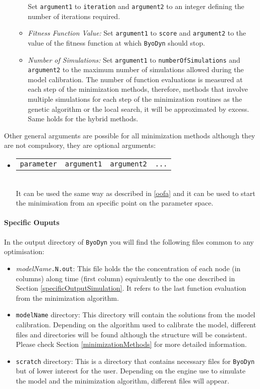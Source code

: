 \documentclass[a4paper, 11pt]{article}
\begin{document}
\begin{itemize}
\begin{itemize}
      Set \texttt{argument1} to \texttt{iteration} and \texttt{argument2} to an integer defining the number of iterations required.
    \item \textit{Fitness Function Value:}
      Set \texttt{argument1} to \texttt{score} and \texttt{argument2} to the value of the fitness function at which \texttt{ByoDyn} should stop.
    \item \textit{Number of Simulations:}
      Set \texttt{argument1} to \texttt{numberOfSimulations} and \texttt{argument2} to the maximum number of simulations allowed during the model calibration.
      The number of function evaluations is measured at each step of the minimization methods, therefore, methods that involve multiple simulations for each step of the minimization routines as the genetic algorithm or the local search, it will be approximated by excess.
      Same holds for the hybrid methods.
  \end{itemize}
\end{itemize}
Other general arguments are possible for all minimization methods although they are not compulsory, they are optional arguments:
\begin{itemize}
\item \begin{tabular}{cccc}\texttt{parameter}&\texttt{argument1}&\texttt{argument2}&\texttt{...}\end{tabular}\\[1.5ex]
  It can be used the same way as described in \ref{oofa} and it can be used to start the minimisation from an specific point on the parameter space.
\end{itemize}
\paragraph{Specific Ouputs} \label{specificOutputOptimisation}
In the output directory of \texttt{ByoDyn} you will find the following files common to any optimisation:
\begin{itemize}
\item \textit{modelName}\texttt{.N.out}:
  This file holds the the concentration of each node (in columns) along time (first column) equivalently to the one described in Section \ref{specificOutputSimulation}.
  It refers to the last function evaluation from the minimization algorithm.
\item \texttt{modelName} directory: 
  This directory will contain the solutions from the model calibration. 
  Depending on the algorithm used to calibrate the model, different files and directories will be found although the structure will be consistent. 
  Please check Section \ref{minimizationMethods} for more detailed information.
\item \texttt{scratch} directory:
  This is a directory that contains necessary files for \texttt{ByoDyn} but of lower interest for the user.
  Depending on the engine use to simulate the model and the minimization algorithm, different files will appear.
\end{itemize}
\end{document}
